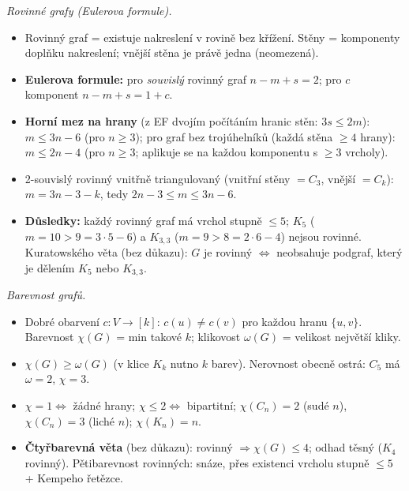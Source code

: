 \documentclass[11pt,a4paper]{article}
\newcommand{\chrom}{\chi}
\newcommand{\klik}{\omega}
\begin{document}
\begin{poznamka}
\smallskip
\emph{Rovinné grafy (Eulerova formule).}
\begin{itemize}
  \item Rovinný graf = existuje nakreslení v rovině bez křížení. Stěny = komponenty doplňku nakreslení; vnější stěna je právě jedna (neomezená).
  \item \textbf{Eulerova formule:} pro \emph{souvislý} rovinný graf $n-m+s=2$; pro $c$ komponent $n-m+s=1+c$.
  \item \textbf{Horní mez na hrany} (z EF dvojím počítáním hranic stěn: $3s\le 2m$): $m\le 3n-6$ (pro $n\ge 3$); pro graf bez trojúhelníků (každá stěna $\ge 4$ hrany): $m\le 2n-4$ (pro $n\ge 3$; aplikuje se na každou komponentu s $\ge 3$ vrcholy).
  \item 2-souvislý rovinný vnitřně triangulovaný (vnitřní stěny $= C_3$, vnější $= C_k$): $m=3n-3-k$, tedy $2n-3\le m\le 3n-6$.
  \item \textbf{Důsledky:} každý rovinný graf má vrchol stupně $\le 5$; $K_5$ ($m=10>9=3\cdot 5-6$) a $K_{3,3}$ ($m=9>8=2\cdot 6-4$) nejsou rovinné. Kuratowského věta (bez důkazu): $G$ je rovinný $\iff$ neobsahuje podgraf, který je dělením $K_5$ nebo $K_{3,3}$.
\end{itemize}

\smallskip
\emph{Barevnost grafů.}
\begin{itemize}
  \item Dobré obarvení $c\colon V\to[k]$: $c(u)\ne c(v)$ pro každou hranu $\{u,v\}$. Barevnost $\chrom(G)$ = min takové $k$; klikovost $\klik(G)$ = velikost největší kliky.
  \item $\chrom(G)\ge\klik(G)$ (v klice $K_k$ nutno $k$ barev). Nerovnost obecně ostrá: $C_5$ má $\klik=2$, $\chrom=3$.
  \item $\chrom=1\iff$ žádné hrany; $\chrom\le 2\iff$ bipartitní; $\chrom(C_n)=2$ (sudé $n$), $\chrom(C_n)=3$ (liché $n$); $\chrom(K_n)=n$.
  \item \textbf{Čtyřbarevná věta} (bez důkazu): rovinný $\Rightarrow\chrom(G)\le 4$; odhad těsný ($K_4$ rovinný). Pětibarevnost rovinných: snáze, přes existenci vrcholu stupně $\le 5$ + Kempeho řetězce.
\end{itemize}


\end{poznamka}
\end{document}
